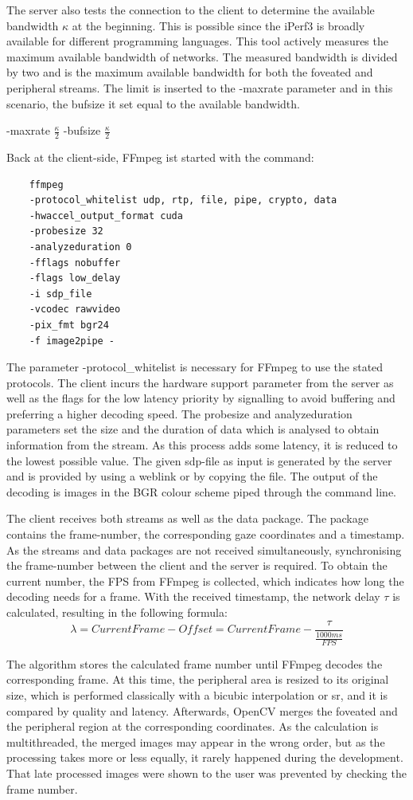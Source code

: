 \par
The server also tests the connection to the client to determine the available bandwidth \(\kappa\) at the beginning. This is possible since the iPerf3 is broadly available for different programming languages. This tool actively measures the maximum available bandwidth of networks. The measured bandwidth is divided by two and is the maximum available bandwidth for both the foveated and peripheral streams. The limit is inserted to the -maxrate parameter and in this scenario, the bufsize it set equal to the available bandwidth. 
\begin{center}
-maxrate \(\frac{\kappa}{2}\) -bufsize \(\frac{\kappa}{2}\)
\end{center}
\par
Back at the client-side, FFmpeg ist started with the command:
\begin{lstlisting}
    ffmpeg 
    -protocol_whitelist udp, rtp, file, pipe, crypto, data
    -hwaccel_output_format cuda 
    -probesize 32
    -analyzeduration 0
    -fflags nobuffer    
    -flags low_delay  
    -i sdp_file
    -vcodec rawvideo
    -pix_fmt bgr24
    -f image2pipe -
\end{lstlisting}
\noindent
The parameter -protocol\_whitelist is necessary for FFmpeg to use the stated protocols. The client incurs the hardware support parameter from the server as well as the flags for the low latency priority by signalling to avoid buffering and preferring a higher decoding speed. The probesize and analyzeduration parameters set the size and the duration of data which is analysed to obtain information from the stream. As this process adds some latency, it is reduced to the lowest possible value. The given sdp-file as input is generated by the server and is provided by using a weblink or by copying the file. The output of the decoding is images in the BGR colour scheme piped through the command line.
\par
The client receives both streams as well as the data package. The package contains the frame-number, the corresponding gaze coordinates and a timestamp. As the streams and data packages are not received simultaneously, synchronising the frame-number between the client and the server is required. To obtain the current number, the FPS from FFmpeg is collected, which indicates how long the decoding needs for a frame. With the received timestamp, the network delay \(\tau\) is calculated, resulting in the following formula:
\[\lambda = CurrentFrame - Offset = CurrentFrame - \frac{\tau}{\frac{1000ms}{FPS}} \]
\par
The algorithm stores the calculated frame number until FFmpeg decodes the corresponding frame. At this time, the peripheral area is resized to its original size, which is performed classically with a bicubic interpolation or \gls{sr}, and it is compared by quality and latency. Afterwards, OpenCV merges the foveated and the peripheral region at the corresponding coordinates. As the calculation is multithreaded, the merged images may appear in the wrong order, but as the processing takes more or less equally, it rarely happened during the development. That late processed images were shown to the user was prevented by checking the frame number. 

